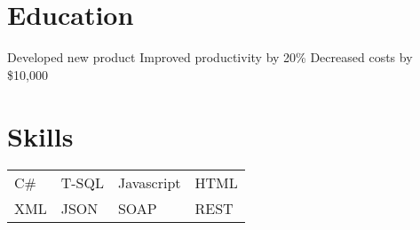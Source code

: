 \documentclass{resume}
\begin{document}
\section{Education}
\workitems
{Developed new product}
{Improved productivity by 20\%}
{Decreased costs by \$10,000}


\section{Skills}

\begin{tabular}{l l l l}
C\# & T-SQL & Javascript & HTML \\
XML & JSON & SOAP & REST
\end{tabular}
\end{document}
